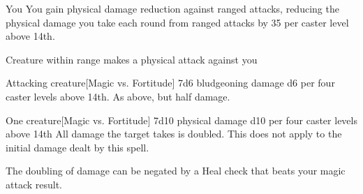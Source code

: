 \begin{spellheader}
    \spelldur{\durshort \dismissable}
\end{spellheader}
\begin{spelleffects}
    \begin{spelltarget}[Primary]{You}
        \spelleffect You gain physical damage reduction against ranged attacks, reducing the physical damage you take each round from ranged attacks by 35  per caster level above 14th.
    \end{spelltarget}
    \begin{spelltrigger}{Creature within \rngclose range makes a physical attack against you}
        \begin{spelltarget}[Secondary]{Attacking creature}[Magic vs. Fortitude]
            \spellsuccess 7d6 bludgeoning damage \add d6 per four caster levels above 14th.
            \spellfailure As above, but half damage.
        \end{spelltarget}
    \end{spelltrigger}
\end{spelleffects}

\begin{spellheader}
    \spellrng{\rngclose}
    \spelldur{\durshort}
\end{spellheader}
\begin{spelleffects}
    \begin{spelltarget}{One creature}[Magic vs. Fortitude]
        \spelleffect 7d10 physical damage \add d10 per four caster levels above 14th
        \spellsuccess All damage the target takes is doubled. This does not apply to the initial damage dealt by this spell.
    \end{spelltarget}
\end{spelleffects}
\begin{spellfooter}
    \spellnotes The doubling of damage can be negated by a Heal check that beats your magic attack result.
\end{spellfooter}

